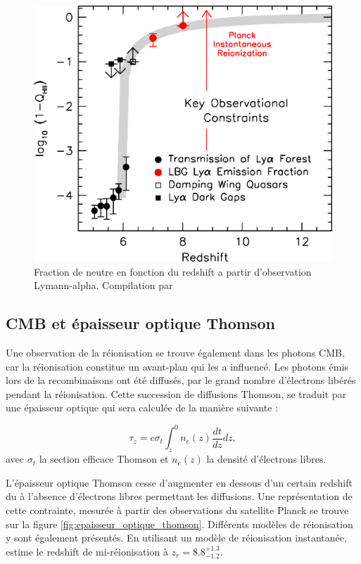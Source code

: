 \begin{figure}
        \includegraphics[width=.95\linewidth]{img/01/xionconstrains.jpg} 
        \caption[Fraction de neutre]{Fraction de neutre en fonction du redshift a partir d'observation Lymann-alpha.
        Compilation par \cite{2015ApJ...811..140B}}
 		\label{fig:compile_constrains}
\end{figure}


\subsection{CMB et épaisseur optique Thomson}

Une observation de la réionisation se trouve également dans les photons \ac{CMB}, car la réionisation constitue un avant-plan qui les a influencé. 
Les photons émis lors de la recombinaisons ont été diffusés, par le grand nombre d'électrons libérés pendant la réionisation.
Cette succession de diffusions Thomson, se traduit par une épaisseur optique qui sera calculée de la manière suivante : 

\begin{equation}
\tau_z = c \sigma_t \int_z^0 n_e (z) \frac{dt}{dz} dz,
\end{equation}
avec $\sigma_t$ la section efficace Thomson et $n_e (z)$ la densité d'électrons libres.

L'épaisseur optique Thomson cesse d'augmenter en dessous d'un certain redshift du à l’absence d'électrons libres permettant les diffusions.
Une représentation de cette contrainte, mesurée à partir des observations du satellite Planck se trouve sur la figure \ref{fig:epaisseur_optique_thomson}.
Différents modèles de réionisation y sont également présentés.
En utilisant un modèle de réionisation instantanée, \cite{planck_collaboration_planck_2016} estime le redshift de mi-réionisation à $z_r = 8.8 ^{+1.3}_{-1.2}$.


